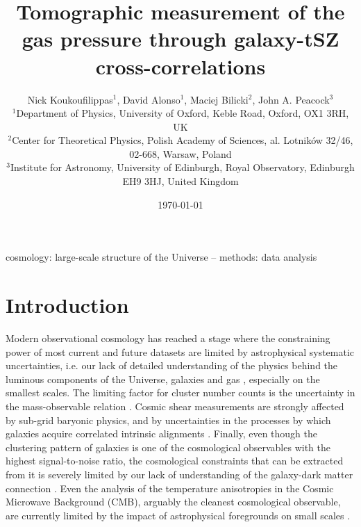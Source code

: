 \documentclass[useAMS,usenatbib]{mn2e}
\title[Tomographic measurement of the gas pressure through galaxy-tSZ cross-correlations]{Tomographic measurement of the gas pressure through galaxy-tSZ cross-correlations}
\author[David Alonso]{Nick Koukoufilippas$^1$, David Alonso$^1$, Maciej Bilicki$^2$, John A. Peacock$^3$\\
                      $^{1}$Department of Physics, University of Oxford, Keble Road, Oxford, OX1 3RH, UK\\
                      $^{2}$Center for Theoretical Physics, Polish Academy of Sciences, al. Lotnik\'ow 32/46, 02-668, Warsaw, Poland\\
                      $^{3}$Institute for Astronomy, University of Edinburgh, Royal Observatory, Edinburgh EH9 3HJ, United Kingdom
                      }
\begin{document}
  \date{\today}
   
  \maketitle

\begin{abstract}
  \lipsum[1]
\end{abstract}

\begin{keywords}
  cosmology: large-scale structure of the Universe -- methods: data analysis
\end{keywords}

\section{Introduction}\label{sec:intro}
  Modern observational cosmology has reached a stage where the constraining power of most current and future datasets are limited by astrophysical systematic uncertainties, i.e. our lack of detailed understanding of the physics behind the luminous components of the Universe, galaxies and gas \citep[e.g.][]{2011MNRAS.415.3649V,2011MNRAS.417.2020S,2014JCAP...04..028F,2015MNRAS.454.2451E,2015MNRAS.454.1958M,2015JCAP...12..049S,2019MNRAS.488.1652H,2019JCAP...03..020S,2019OJAp....2E...4C}, especially on the smallest scales. The limiting factor for cluster number counts is the uncertainty in the mass-observable relation \citep{2009ApJ...692.1060V,2010ApJ...722.1180V,2011ApJ...732...44S,2013JCAP...07..008H,2014MNRAS.440.2077M,2014A&A...571A..20P,2015MNRAS.446.2205M,2016A&A...594A..24P,2016ApJ...832...95D,2019ApJ...878...55B}. Cosmic shear measurements are strongly affected by sub-grid baryonic physics, and by uncertainties in the processes by which galaxies acquire correlated intrinsic alignments \citep[e.g.][]{2001MNRAS.320L...7C,2002MNRAS.332..788M,2004PhRvD..70f3526H,2017MNRAS.465.2033J,2018PhRvD..98d3528T,2018arXiv181206076H,2018ARA&A..56..393M,2018arXiv181106989S}. Finally, even though the clustering pattern of galaxies is one of the cosmological observables with the highest signal-to-noise ratio, the cosmological constraints that can be extracted from it is severely limited by our lack of understanding of the galaxy-dark matter connection \citep[see e.g.][and references therein]{2018ARA&A..56..435W}. Even the analysis of the temperature anisotropies in the Cosmic Microwave Background (CMB), arguably the cleanest cosmological observable, are currently limited by the impact of astrophysical foregrounds on small scales \citep{2014ApJ...782...74H,2017JCAP...06..031L,2019arXiv190712875P}.
  
\end{document}
